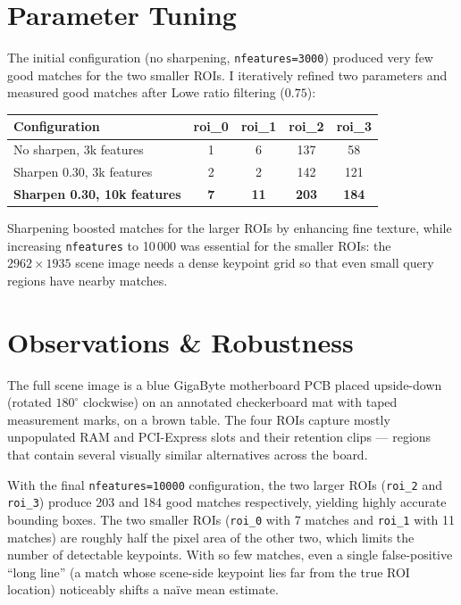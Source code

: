 \documentclass[11pt,a4paper]{article}
\begin{document}
\section*{Parameter Tuning}
The initial configuration (no sharpening, \texttt{nfeatures=3000}) produced very few good matches for the two smaller ROIs.
I iteratively refined two parameters and measured good matches after Lowe ratio filtering ($0.75$):

\begin{center}
\begin{tabular}{l|c c c c}
    \textbf{Configuration} & \textbf{roi\_0} & \textbf{roi\_1} & \textbf{roi\_2} & \textbf{roi\_3} \\
    \hline
    No sharpen, 3k features & 1 & 6 & 137 & 58 \\
    Sharpen 0.30, 3k features & 2 & 2 & 142 & 121 \\
    \textbf{Sharpen 0.30, 10k features} & \textbf{7} & \textbf{11} & \textbf{203} & \textbf{184} \\
\end{tabular}
\end{center}

Sharpening boosted matches for the larger ROIs by enhancing fine texture, while increasing \texttt{nfeatures} to 10\,000 was essential for the smaller ROIs: the $2962\times1935$ scene image needs a dense keypoint grid so that even small query regions have nearby matches.

\section*{Observations \& Robustness}
The full scene image is a blue GigaByte motherboard PCB placed upside-down (rotated $180^{\circ}$ clockwise) on an annotated checkerboard mat with taped measurement marks, on a brown table.
The four ROIs capture mostly unpopulated RAM and PCI-Express slots and their retention clips --- regions that contain several visually similar alternatives across the board.

With the final \texttt{nfeatures=10000} configuration, the two larger ROIs (\texttt{roi\_2} and \texttt{roi\_3}) produce 203 and 184 good matches respectively, yielding highly accurate bounding boxes.
The two smaller ROIs (\texttt{roi\_0} with 7 matches and \texttt{roi\_1} with 11 matches) are roughly half the pixel area of the other two, which limits the number of detectable keypoints.
With so few matches, even a single false-positive ``long line'' (a match whose scene-side keypoint lies far from the true ROI location) noticeably shifts a na\"ive mean estimate.
\end{document}
